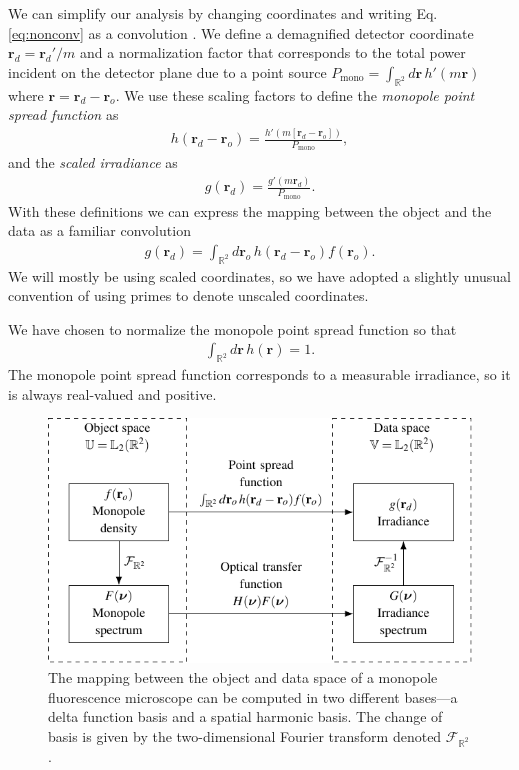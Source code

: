 \documentclass[]{osa-article}
\providecommand{\mb}[1]{\mathbf{#1}}
\providecommand{\ro}{\mathbf{\mathbf{r}}_o}
\providecommand{\rd}{\mathbf{r}_d}
\providecommand{\mbb}[1]{\mathbb{#1}}
\begin{document}
We can simplify our analysis by changing coordinates and writing Eq.
\ref{eq:nonconv} as a convolution \cite{barrett2004}. We define a demagnified
detector coordinate $\rd = \rd'/m$ and a normalization factor that corresponds
to the total power incident on the detector plane due to a point source
$P_{\text{mono}} = \int_{\mbb{R}^2}d\mb{r}\,h'(m\mb{r})$ where
$\mb{r} = \rd - \ro$. We use these scaling factors to define the
\textit{monopole point spread function} as
\begin{align}
  h(\rd - \ro) = \frac{h'(m[\rd - \ro])}{P_{\text{mono}}},
\end{align}
and the \textit{scaled irradiance} as
\begin{align}
  g(\rd) = \frac{g'(m\rd)}{P_{\text{mono}}}.
\end{align}
With these definitions we can express the mapping between the object and the
data as a familiar convolution
\begin{align}
  g(\rd) = \int_{\mbb{R}^2}d\ro\, h(\rd - \ro)f(\ro).  \label{eq:lsi}
\end{align}
We will mostly be using scaled coordinates, so we have adopted a slightly
unusual convention of using primes to denote unscaled coordinates.

We have chosen to normalize the monopole point spread function so that
\begin{align}
  \int_{\mbb{R}^2}d\mb{r}\, h(\mb{r}) = 1. \label{eq:norm}
\end{align}
The monopole point spread function corresponds to a
measurable irradiance, so it is always real-valued and positive.

\begin{figure}
  \centering
  \includegraphics[scale=1.0]{../figures/monopole-block/monopole-block.pdf}
  \caption{The mapping between the object and data space of a monopole
    fluorescence microscope can be computed in two different bases---a delta
    function basis and a spatial harmonic basis. The change of basis is given by
    the two-dimensional Fourier transform denoted $\mathcal{F}_{\mbb{R}^2}$.}
     \label{fig:monopole-block}      
\end{figure}
\end{document}
